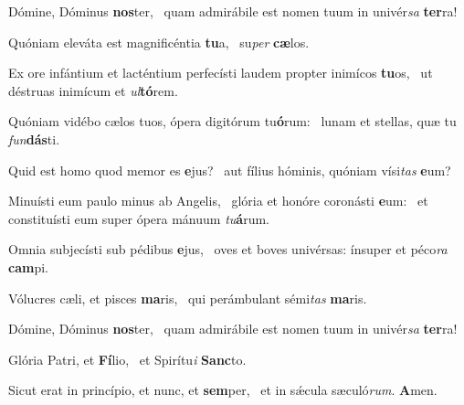 \item Dómine, Dóminus \textbf{nos}ter,~\psstar{} quam admirábile est nomen tuum in univér\textit{sa} \textbf{ter}ra!
\item Quóniam eleváta est magnificéntia \textbf{tu}a,~\psstar{} su\textit{per} \textbf{cæ}los.
\item Ex ore infántium et lacténtium perfecísti laudem propter inimícos \textbf{tu}os,~\psstar{} ut déstruas inimícum et \textit{ul}\textbf{tó}rem.
\item Quóniam vidébo cælos tuos, ópera digitórum tu\textbf{ó}rum:~\psstar{} lunam et stellas, quæ tu \textit{fun}\textbf{dás}ti.
\item Quid est homo quod memor es \textbf{e}jus?~\psstar{} aut fílius hóminis, quóniam vísi\textit{tas} \textbf{e}um?
\item Minuísti eum paulo minus ab Angelis,~\pscross{} glória et honóre coronásti \textbf{e}um:~\psstar{} et constituísti eum super ópera mánuum \textit{tu}\textbf{á}rum.
\item Omnia subjecísti sub pédibus \textbf{e}jus,~\psstar{} oves et boves univérsas: ínsuper et péco\textit{ra} \textbf{cam}pi.
\item Vólucres cæli, et pisces \textbf{ma}ris,~\psstar{} qui perámbulant sémi\textit{tas} \textbf{ma}ris.
\item Dómine, Dóminus \textbf{nos}ter,~\psstar{} quam admirábile est nomen tuum in univér\textit{sa} \textbf{ter}ra!
\item Glória Patri, et \textbf{Fí}lio,~\psstar{} et Spirítu\textit{i} \textbf{Sanc}to.
\item Sicut erat in princípio, et nunc, et \textbf{sem}per,~\psstar{} et in sǽcula sæculó\textit{rum}. \textbf{A}men.
